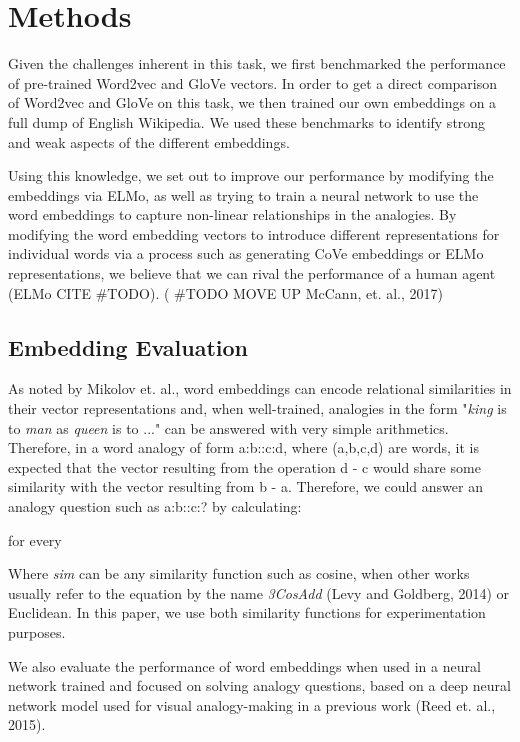 \documentclass[11pt]{article}
\begin{document}
\section{Methods}

Given the challenges inherent in this task, we first benchmarked the
performance of pre-trained Word2vec and GloVe vectors. In order to get a
direct comparison of Word2vec and GloVe on this task, we then trained
our own embeddings on a full dump of English Wikipedia. We used these
benchmarks to identify strong and weak aspects of the different
embeddings.

Using this knowledge, we set out to improve our performance by modifying
the embeddings via ELMo, as well as trying to train a neural network to
use the word embeddings to capture non-linear relationships in the
analogies. By modifying the word embedding vectors to introduce
different representations for individual words via a process such as
generating CoVe embeddings or ELMo representations, we believe that we
can rival the performance of a human agent (ELMo CITE \#TODO). ( \#TODO MOVE UP McCann, et. al., 2017)

\subsection{Embedding Evaluation}

As noted by Mikolov et. al., word embeddings can encode relational similarities
in their vector representations and, when well-trained, analogies in the form
"\emph{king }is to \emph{man }as \emph{queen }is to ..." can be answered with
very simple arithmetics. Therefore, in a word analogy of form a:b::c:d, where
(a,b,c,d) are words, it is expected that the vector resulting from the operation
d - c would share some similarity with the vector resulting from b - a.
Therefore, we could answer an analogy question such as a:b::c:? by calculating:

for every

Where \emph{sim }can be any similarity function such as cosine, when
other works usually refer to the equation by the name \emph{3CosAdd}
(Levy and Goldberg, 2014) or Euclidean. In this paper, we use both
similarity functions for experimentation purposes.

We also evaluate the performance of word embeddings when used in a
neural network trained and focused on solving analogy questions, based
on a deep neural network model used for visual analogy-making in a
previous work (Reed et. al., 2015).
\end{document}
